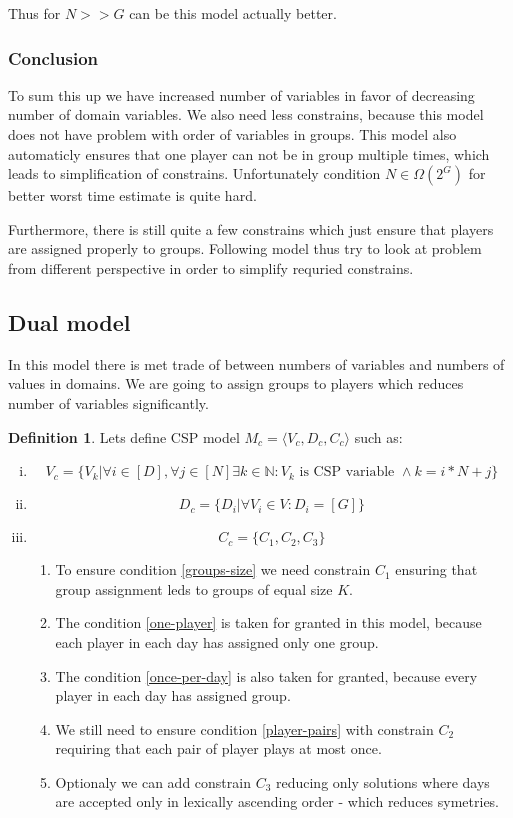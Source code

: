 \documentclass[a4paper]{article}
\theoremstyle{definition}
\newtheorem{definition}{Definition}[section]
\theoremstyle{remark}
\newcommand{\mdef}[2]{
	\theoremstyle{definition}
	\begin{definition}{#1}
	#2
	\end{definition}
}
\begin{document}
Thus for $N >> G$ can be this model actually better.

\subsubsection{Conclusion}
To sum this up we have increased number of variables in favor of decreasing number of domain variables.
We also need less constrains, because this model does not have problem with order of
variables in groups. This model also automaticly ensures that one player
can not be in group multiple times, which leads to simplification of constrains.
Unfortunately condition $N \in \Omega(2^G)$ for better worst time estimate is quite hard.

Furthermore, there is still quite a few constrains which just ensure that players
are assigned properly to groups. Following model thus try to look at problem from
different perspective in order to simplify requried constrains.

\subsection{Dual model}
In this model there is met trade of between numbers of variables and numbers of values in domains.
We are going to assign groups to players which reduces number of variables significantly.

\mdef{}{ Lets define CSP model $M_c = \langle V_c,D_c,C_c \rangle$ such as:
	\begin{enumerate}[(i)]
		\item $$ V_c = \{V_k|  \forall i \in [D], \forall j \in [N] \exists k \in \mathbb{N}: V_k \text{ is CSP variable } \land  k=i*N+j \} $$
		\item $$ D_c = \{D_i| \forall V_i \in V: D_i = [G] \} $$
		\item $$ C_c = \{ C_1, C_2, C_3\} $$
		\begin{enumerate}
			\item To ensure condition \ref{groups-size} we need constrain $C_1$ ensuring that group assignment leds to 
			groups of equal size $K$.
			\item The condition \ref{one-player} is taken for granted in this model, because each player in each day has assigned only one group.
			\item The condition \ref{once-per-day} is also taken for granted, because every player  in each day has assigned group.
			\item We still need to ensure condition \ref{player-pairs} with constrain $C_2$ requiring that each pair of player plays at most once.
			\item Optionaly we can add constrain $C_3$ reducing only solutions where days are accepted only in lexically ascending order - which reduces symetries.
		\end{enumerate}
	\end{enumerate}
}
\end{document}
